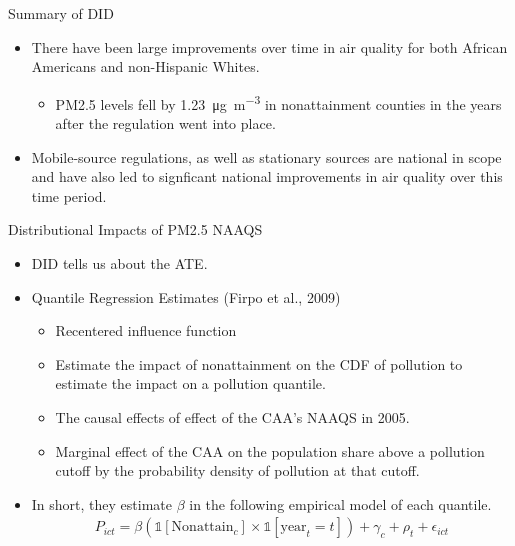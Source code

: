 \documentclass[dvipdfmx,12pt]{beamer}
\begin{document}
\begin{frame}{Summary of DID}
  \begin{itemize}
    \item There have been large improvements over time in air quality for both African Americans and non-Hispanic Whites.
    \begin{itemize}
      \item PM2.5 levels fell by \SI[per-mode=symbol]{1.23}{\micro \gram \per \cubic \meter} in nonattainment counties in
      the years after the regulation went into place.
    \end{itemize}
    \item Mobile-source regulations, as well as stationary sources are national in scope and have also led to signficant national improvements in air quality over this time period.
  \end{itemize}
\end{frame}

\begin{frame}{Distributional Impacts of PM2.5 NAAQS}
  \begin{itemize}
    \item DID tells us about the ATE.
    \item Quantile Regression Estimates (Firpo et al., 2009)
    \begin{itemize}
      \item Recentered influence function
      \item Estimate the impact of nonattainment on the CDF of pollution to estimate the impact on a pollution quantile.
      \item The causal effects of effect of the CAA's NAAQS in 2005.
      \item Marginal effect of the CAA on the population share above a pollution cutoff by the probability density of pollution at that cutoff.
    \end{itemize}
    \item In short, they estimate $\beta$ in the following empirical model of each quantile.
    \begin{align*}
      P_{ict} = \beta (\mathbb{1}[\text{Nonattain}_c] \times \mathbb{1}[\text{year}_t = t]) + \gamma_c + \rho_t + \epsilon_{ict}
    \end{align*}
  \end{itemize}
\end{frame}
\end{document}
